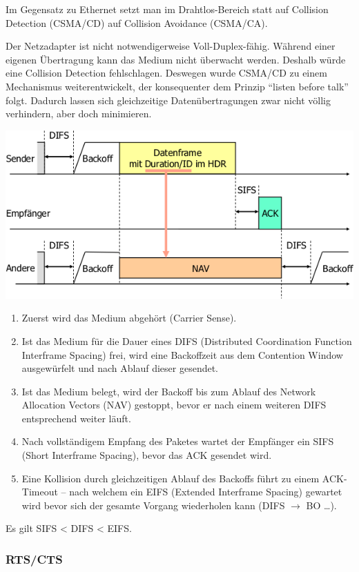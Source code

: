 Im Gegensatz zu Ethernet setzt man im Drahtlos-Bereich statt auf Collision
Detection (CSMA/CD) auf Collision Avoidance (CSMA/CA).

Der Netzadapter ist nicht notwendigerweise Voll-Duplex-fähig. Während einer
eigenen Übertragung kann das Medium nicht überwacht werden. Deshalb würde eine
Collision Detection fehlschlagen. Deswegen wurde CSMA/CD zu einem Mechanismus
weiterentwickelt, der konsequenter dem Prinzip ``listen before talk'' folgt.
Dadurch lassen sich gleichzeitige Datenübertragungen zwar nicht völlig
verhindern, aber doch minimieren.

\begin{center}
	\includegraphics[width=.8\textwidth]{media/csma_ca.png}
\end{center}

\begin{enumerate}
	\item Zuerst wird das Medium abgehört (Carrier Sense).
	\item Ist das Medium für die Dauer eines DIFS (Distributed Coordination
		Function Interframe Spacing) frei, wird eine Backoffzeit aus dem Contention
		Window ausgewürfelt und nach Ablauf dieser gesendet.
	\item Ist das Medium belegt, wird der Backoff bis zum Ablauf des Network
		Allocation Vectors (NAV) gestoppt, bevor er nach einem weiteren DIFS
		entsprechend weiter läuft.
	\item Nach vollständigem Empfang des Paketes wartet der Empfänger ein SIFS
		(Short Interframe Spacing), bevor das ACK gesendet wird.
	\item Eine Kollision durch gleichzeitigen Ablauf des Backoffs führt zu einem
		ACK-Timeout -- nach welchem ein EIFS (Extended Interframe Spacing) gewartet
		wird bevor sich der gesamte Vorgang wiederholen kann (DIFS $\rightarrow$ BO
		\ldots).
\end{enumerate}

Es gilt SIFS < DIFS < EIFS.


\subsubsection{RTS/CTS}

